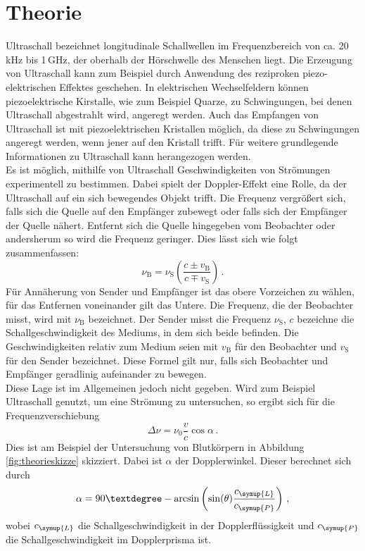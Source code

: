\section{Theorie}
\label{sec:Theorie}
Ultraschall bezeichnet longitudinale Schallwellen im Frequenzbereich von ca.
20\,kHz bis 1\,GHz, der oberhalb der Hörschwelle des Menschen liegt.
Die Erzeugung von Ultraschall kann zum Beispiel durch Anwendung des reziproken piezo-elektrischen
Effektes geschehen. In elektrischen Wechselfeldern können piezoelektrische Kirstalle, wie zum Beispiel Quarze,
zu Schwingungen, bei denen Ultraschall abgestrahlt wird, angeregt werden. Auch das Empfangen
von Ultraschall ist mit piezoelektrischen Kristallen möglich, da diese zu Schwingungen
angeregt werden, wenn jener auf den Kristall trifft.
Für weitere grundlegende Informationen zu Ultraschall kann \cite{VersuchsanleitungUS2}
herangezogen werden.\\
Es ist möglich, mithilfe von Ultraschall Geschwindigkeiten von Strömungen experimentell
zu bestimmen. Dabei spielt der Doppler-Effekt eine Rolle, da der Ultraschall auf
ein sich bewegendes Objekt trifft. Die Frequenz vergrößert sich, falls sich die Quelle auf den
Empfänger zubewegt oder falls sich der Empfänger der Quelle nähert. Entfernt sich die Quelle
hingegeben vom Beobachter oder andersherum so wird die Frequenz geringer. Dies lässt sich wie folgt
zusammenfassen:
\begin{equation}
  \nu_\text{B} = \nu_\text{S} \left(\frac{c \pm v_\text{B}}{c \mp v_\text{S}}\right)\,.
  \label{eqn:geschwindigkeit}
\end{equation}
Für Annäherung von Sender und Empfänger ist das obere Vorzeichen zu wählen, für
das Entfernen voneinander gilt das Untere. Die Frequenz, die der Beobachter misst,
wird mit $\nu_\text{B}$ bezeichnet. Der Sender misst die Frequenz $\nu_\text{S}$, $c$ bezeichne
die Schallgeschwindigkeit des Mediums, in dem sich beide befinden. Die Geschwindigkeiten
relativ zum Medium seien mit $v_\text{B}$ für den Beobachter und $v_\text{S}$ für den
Sender bezeichnet. Diese Formel gilt nur, falls sich Beobachter und Empfänger geradlinig
aufeinander zu bewegen.\\
Diese Lage ist im Allgemeinen jedoch nicht gegeben. Wird zum Beispiel Ultraschall
genutzt, um eine Strömung zu untersuchen, so ergibt sich für die Frequenzverschiebung
\begin{equation}
  \Delta \nu = \nu_0 \frac{v}{c} \cos \alpha\,.
  \label{eqn:deltanu}
\end{equation}
Dies ist am Beispiel der Untersuchung von Blutkörpern in Abbildung \ref{fig:theorieskizze}
skizziert. Dabei ist $\alpha$ der Dopplerwinkel. Dieser berechnet sich durch
\begin{equation}
  \alpha=90°-\arcsin\left(\sin(\theta)\frac{c_{\symup{L}}}{c_{\symup{P}}}\right) \,,
  \label{eqn:dopplerwinkel}
\end{equation}
wobei $c_{\symup{L}}$ die Schallgeschwindigkeit in der Dopplerflüssigkeit und
$c_{\symup{P}}$ die Schallgeschwindigkeit im Dopplerprisma ist.

